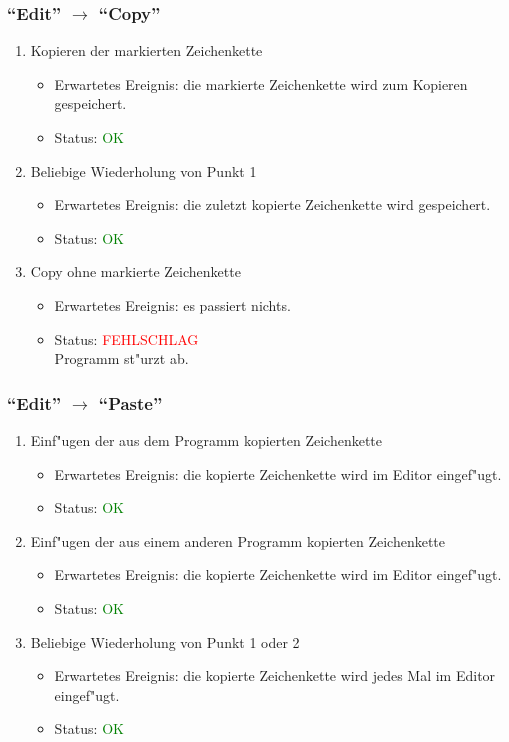 \subsubsection{"`Edit"' $\rightarrow$ "`Copy"'}
\begin{enumerate}
\item Kopieren der markierten Zeichenkette
\begin{itemize}
\item Erwartetes Ereignis: die markierte Zeichenkette wird zum Kopieren gespeichert. 
\item Status: \textcolor{green}{OK}
\end{itemize}
\item Beliebige Wiederholung von Punkt 1
\begin{itemize}
\item Erwartetes Ereignis: die zuletzt kopierte Zeichenkette wird gespeichert. 
\item Status: \textcolor{green}{OK}
\end{itemize}
\item Copy ohne markierte Zeichenkette
\begin{itemize}
\item Erwartetes Ereignis: es passiert nichts. 
\item Status: \textcolor{red}{FEHLSCHLAG} \\
Programm st"urzt ab.
\end{itemize}
\end{enumerate}
\subsubsection{"`Edit"' $\rightarrow$ "`Paste"'}
\begin{enumerate}
\item Einf"ugen der aus dem Programm kopierten Zeichenkette
\begin{itemize}
\item Erwartetes Ereignis: die kopierte Zeichenkette wird im Editor eingef"ugt. 
\item Status: \textcolor{green}{OK}
\end{itemize}
\item Einf"ugen der aus einem anderen Programm kopierten Zeichenkette
\begin{itemize}
\item Erwartetes Ereignis: die kopierte Zeichenkette wird im Editor eingef"ugt. 
\item Status: \textcolor{green}{OK}
\end{itemize}
\item Beliebige Wiederholung von Punkt 1 oder 2
\begin{itemize}
\item Erwartetes Ereignis: die kopierte Zeichenkette wird jedes Mal im Editor eingef"ugt. 
\item Status: \textcolor{green}{OK}
\end{itemize}
\end{enumerate}
